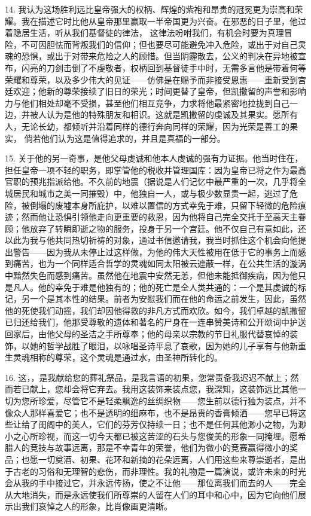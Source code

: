 14. 我认为这场胜利远比皇帝强大的权柄、辉煌的紫袍和昂贵的冠冕更为崇高和荣耀。我在描述它时比他从皇帝那里赢取一半帝国更为兴奋。在邪恶的日子里，他过着隐居生活，听从我们基督徒的律法， 这律法吩咐我们，有机会时要为真理冒险，不可因胆怯而背叛我们的信仰；但也要尽可能避免冲入危险，或出于对自己灵魂的恐惧，或出于对带来危险之人的顾惜。但当阴霾散去，公义的判决在异地被宣布，闪亮的刀剑击倒了不虔敬者，权柄回到基督徒手中时，无需多言他是带着何等荣耀和尊荣，以及多少伟大的见证——仿佛是在赐予而非接受恩惠——重新受到宫廷欢迎；他新的尊荣接续了旧日的荣光；时间更替了皇帝，但凯撒留的声誉和影响力与他们相处却毫不受损，甚至他们相互竞争，力求将他最紧密地拉拢到自己一边，并被人认为是他的特殊朋友和相识。这就是凯撒留的虔诚及其果实。愿所有人，无论长幼，都倾听并沿着同样的德行奔向同样的荣耀，因为光荣是善工的果实， 倘若他们认为这是值得追求的，并且是真福的一部分。\par

15. 关于他的另一奇事，是他父母虔诚和他本人虔诚的强有力证据。他当时住在，担任皇帝一项不轻的职务，即掌管他的税收并管理国库：因为皇帝已将之作为最高官职的预兆指派给他。不久前的地震（据说是人们记忆中最严重的一次，几乎将全城居民和城市之美一同摧毁）中，他独自一人，或与极少数显贵一起，逃过了危险，被倒塌的废墟本身所庇护，以难以置信的方式幸免于难，只留下轻微的危险痕迹；然而他让恐惧引领他走向更重要的救恩，因为他将自己完全交托于至高天主眷顾；他放弃了转瞬即逝之物的服务，投身于另一个宫廷。他不仅自己有意如此，还以此为我与他共同热切祈祷的对象，通过书信邀请我，我当时抓住这个机会向他提出警告——因为我从未停止过这样做，为他的伟大天性被用在低于它的事务上而感到痛苦，也为一个同样适合哲学的灵魂如同太阳被云遮蔽一样，在公共生活的漩涡中黯然失色而感到痛苦。虽然他在地震中安然无恙，但他未能抵御疾病，因为他只是凡人。他的幸免于难是他独有的；他的死亡是全人类共通的：一个是其虔诚的标记，另一个是其本性的结果。前者为安慰我们而在他的命运之前发生，因此，虽然他的死使我们动摇，我们却因他得救的非凡方式而欢欣。如今，我们卓越的凯撒留已归还给我们，他那受尊敬的遗体和著名的尸身在一连串赞美诗和公开颂词中护送回家后，由他父母的圣洁之手所尊奉；他的母亲以宗教的节日礼服代替哀悼的装饰，以她的哲学战胜了眼泪，以咏唱圣诗平息了哀歌，因为她的儿子享有与他新重生灵魂相称的尊荣，这个灵魂是通过水，由圣神所转化的。\par

16. 这，，是我献给您的葬礼祭品，是我言语的初果，您常责备我迟迟不献上；然而若已献上，您却会将它弃去。我用这装饰来装点您，我深知，这装饰远比其他一切为您所珍爱，尽管它不是轻柔飘逸的丝绸织物——您生前以德行独为装点，并不像众人那样喜爱它；也不是透明的细麻布，也不是昂贵的香膏倾洒——您早已将这些让给了闺阁中的美人，它们的芬芳仅持续一日；也不是任何其他渺小之物，为渺小之心所珍视，而这一切今天都已被这苦涩的石头与您俊美的形象一同掩埋。愿希腊人的竞技与故事远离，那是不幸青年的荣誉，他们为微小的竞赛赢得微小的奖品；也愿一切奠酒、初果、花环和新摘的花朵远离，人们用这些来尊崇逝者，是出于古老的习俗和无理智的悲伤，而非理性。我的礼物是一篇演说，或许未来的时光会从我的手中接过它，并永远传扬，使之不让他——那位离我们而去的人——完全从大地消失，而是永远使我们所尊崇的人留在人们的耳中和心中，因为它向他们展示出我们哀悼之人的形象，比肖像画更清晰。\par

